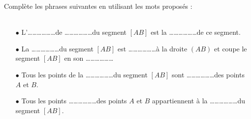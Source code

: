 Complète les phrases suivantes en utilisant les mots proposés :
\\
\\\vspace{1cm}
\begin{itemize}
	\item[$\bullet$] L'\ldots\ldots\ldots\ldots\ldots\ldots  de \ldots\ldots\ldots\ldots\ldots\ldots  du segment $[AB]$ est la \ldots\ldots \ldots\ldots\ldots\ldots de ce segment.
	\vspace{0.3cm}
	\item[$\bullet$] La \ldots\ldots\ldots\ldots\ldots\ldots  du
          segment $[AB]$ est \ldots\ldots \ldots\ldots\ldots\ldots à
          la droite $(AB)$ et coupe le segment $[AB]$ en son \ldots\ldots\ldots\ldots\ldots\ldots 
	\vspace{0.3cm}
	\item[$\bullet$]  Tous les points de la \ldots\ldots \ldots\ldots\ldots\ldots du segment $[AB]$ sont \ldots\ldots \ldots\ldots\ldots\ldots des points $A$ et $B$.
	\vspace{0.3cm}
	\item[$\bullet$] Tous les points \ldots\ldots \ldots\ldots\ldots\ldots des points $A$ et $B$ appartiennent à la \ldots\ldots \ldots\ldots\ldots\ldots du segment $[AB]$. 
\end{itemize}